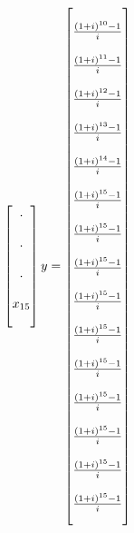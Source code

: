 \documentclass[11pt, a4paper, titlepage, openright]{article}
\begin{document}
\[\begin{bmatrix}
            . \\\\
            . \\\\
            . \\\\
            x_{15} \\\\
        \end{bmatrix}
        \\
        y =
        \begin{bmatrix}
            \\
            \frac{(1+i)^{10} - 1}{i} \\\\
            \frac{(1+i)^{11} - 1}{i} \\\\
            \frac{(1+i)^{12} - 1}{i} \\\\
            \frac{(1+i)^{13} - 1}{i} \\\\
            \frac{(1+i)^{14} - 1}{i} \\\\
            \frac{(1+i)^{15} - 1}{i} \\\\
            \frac{(1+i)^{15} - 1}{i} \\\\
            \frac{(1+i)^{15} - 1}{i} \\\\
            \frac{(1+i)^{15} - 1}{i} \\\\
            \frac{(1+i)^{15} - 1}{i} \\\\
            \frac{(1+i)^{15} - 1}{i} \\\\
            \frac{(1+i)^{15} - 1}{i} \\\\
            \frac{(1+i)^{15} - 1}{i} \\\\
            \frac{(1+i)^{15} - 1}{i} \\\\
            \frac{(1+i)^{15} - 1}{i} \\\\
        \end{bmatrix}
    \]


\bigskip
\bigskip
\end{document}
